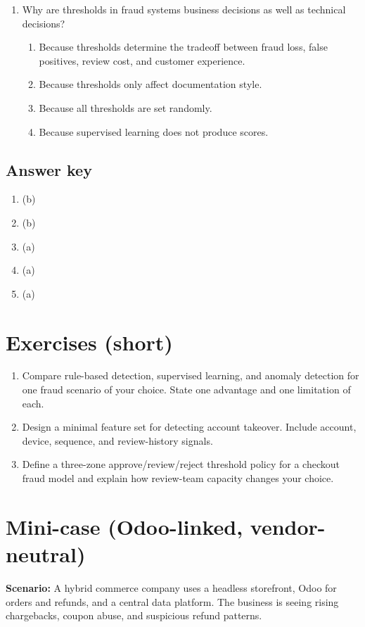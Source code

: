 \begin{enumerate}
  \item Why are thresholds in fraud systems business decisions as well as technical decisions?
  \begin{enumerate}
    \item Because thresholds determine the tradeoff between fraud loss, false positives, review cost, and customer experience.
    \item Because thresholds only affect documentation style.
    \item Because all thresholds are set randomly.
    \item Because supervised learning does not produce scores.
  \end{enumerate}
\end{enumerate}

\subsection*{Answer key}
\begin{enumerate}
  \item (b)
  \item (b)
  \item (a)
  \item (a)
  \item (a)
\end{enumerate}

\section{Exercises (short)}
\begin{enumerate}
  \item Compare rule-based detection, supervised learning, and anomaly detection for one fraud scenario of your choice. State one advantage and one limitation of each.
  \item Design a minimal feature set for detecting account takeover. Include account, device, sequence, and review-history signals.
  \item Define a three-zone approve/review/reject threshold policy for a checkout fraud model and explain how review-team capacity changes your choice.
\end{enumerate}

\section{Mini-case (Odoo-linked, vendor-neutral)}
\textbf{Scenario:} A hybrid commerce company uses a headless storefront, Odoo for orders and refunds, and a central data platform. The business is seeing rising chargebacks, coupon abuse, and suspicious refund patterns.

